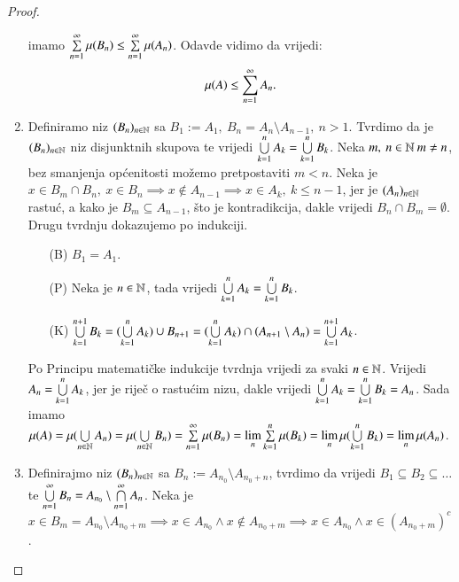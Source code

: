 \begin{proof}
\begin{enumerate}[label={(\roman*)}]
            imamo $\sum\limits_{n=1}^{\infty} \mu({B_n}) \leq \sum\limits_{n=1}^{\infty} \mu({A_n})$.
            Odavde vidimo da vrijedi:
            \begin{equation*}
                \mu({A}) \leq \sum\limits_{n=1}^{\infty} A_n.
            \end{equation*}
        \item Definiramo niz $(B_n)_{n \in \mathbb{N}}$ sa $B_1 := A_1, \: B_n = A_n \setminus
            A_{n-1}, \: n > 1$. Tvrdimo da je $(B_n)_{n \in \mathbb{N}}$ niz disjunktnih skupova
            te vrijedi $\bigcup\limits_{k=1}^{n} A_k = \bigcup\limits_{k=1}^{n} B_k$. Neka $m, \: n \in \mathbb{N}
            \: m \neq n$, bez smanjenja op\' cenitosti mo\v zemo pretpostaviti $m < n$.
            Neka je $x \in B_m \cap B_n, \: x \in B_n \implies x \notin A_{n-1}
            \implies x \in A_k, \: k \leq n-1$, jer je $(A_n)_{n \in \mathbb{N}}$ rastu\' c,
            a kako je $B_m \subseteq A_{n-1}$, \v sto je kontradikcija, dakle vrijedi
            $B_n \cap B_m = \emptyset$. Drugu tvrdnju dokazujemo po indukciji.
            \begin{enumerate}
                \item[(B)] $B_1 = A_1$.
                \item[(P)] Neka je $n \in \mathbb{N}$, tada vrijedi $\bigcup\limits_{k=1}^{n} A_k
                    = \bigcup\limits_{k=1}^{n} B_k$.
                \item[(K)] $\bigcup\limits_{k=1}^{n+1} B_k = (\bigcup\limits_{k=1}^{n} A_k) \cup B_{n+1}
                    = (\bigcup\limits_{k=1}^{n} A_k) \cap (A_{n+1} \setminus A_n)
                    = \bigcup\limits_{k=1}^{n+1} A_k$.
            \end{enumerate}
            Po Principu matemati\v cke indukcije tvrdnja vrijedi za svaki $n \in \mathbb{N}$.
            Vrijedi $A_n = \bigcup\limits_{k=1}^{n} A_k$, jer je rije\v c o rastu\' cim nizu,
            dakle vrijedi $\bigcup\limits_{k=1}^{n} A_k = \bigcup\limits_{k = 1}^{n} B_k = A_n$.
            Sada imamo $\mu({A}) = \mu({\bigcup\limits_{n \in \mathbb{N}}^{} A_n}) = \mu({
                \bigcup\limits_{n \in \mathbb{N}}^{} B_n}) = \sum\limits_{n=1}^{\infty} \mu({B_n})
                = \lim\limits_{n} \sum\limits_{k=1}^{n} \mu({B_k}) = \lim\limits_{n}
                \mu({\bigcup\limits_{k=1}^{n} B_k}) = \lim\limits_{n} \mu({A_n})$.
        \item Definirajmo niz $(B_n)_{n \in \mathbb{N}}$ sa $B_n := A_{n_0} \setminus
            A_{n_0 + n}$, tvrdimo da vrijedi $B_1 \subseteq B_2 \subseteq \dots$ te
            $\bigcup\limits_{n=1}^{\infty} B_n = A_{n_0} \setminus \bigcap\limits_{n=1}^{\infty} A_n$.
            Neka je $x \in B_m = A_{n_0} \setminus A_{n_0+m} \implies x \in A_{n_0}
            \land x \notin A_{n_0+m} \implies x \in A_{n_0} \land x \in (A_{n_0+m})^c$.

\end{enumerate}
\end{proof}
